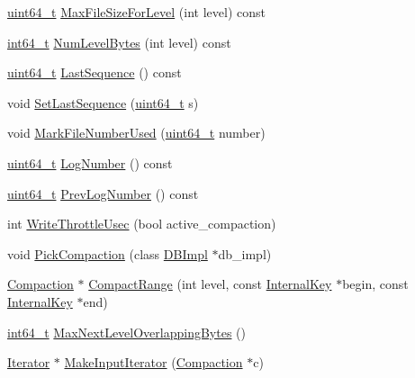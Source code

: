 \begin{DoxyCompactItemize}
\hyperlink{stdint_8h_aaa5d1cd013383c889537491c3cfd9aad}{uint64\+\_\+t} \hyperlink{classleveldb_1_1_version_set_ac856b3302fd2c4d6cf31e43982c3cf68}{Max\+File\+Size\+For\+Level} (int level) const 
\item 
\hyperlink{stdint_8h_adec1df1b8b51cb32b77e5b86fff46471}{int64\+\_\+t} \hyperlink{classleveldb_1_1_version_set_adfe3e1061becd9e2756b2dd4447b52e0}{Num\+Level\+Bytes} (int level) const 
\item 
\hyperlink{stdint_8h_aaa5d1cd013383c889537491c3cfd9aad}{uint64\+\_\+t} \hyperlink{classleveldb_1_1_version_set_acbbb32422426416b0d5e58d35b151526}{Last\+Sequence} () const 
\item 
void \hyperlink{classleveldb_1_1_version_set_a2234860e72a1ac7361d7bee107da6a07}{Set\+Last\+Sequence} (\hyperlink{stdint_8h_aaa5d1cd013383c889537491c3cfd9aad}{uint64\+\_\+t} s)
\item 
void \hyperlink{classleveldb_1_1_version_set_a8a009a58938b12c7a69bda2b4da115a0}{Mark\+File\+Number\+Used} (\hyperlink{stdint_8h_aaa5d1cd013383c889537491c3cfd9aad}{uint64\+\_\+t} number)
\item 
\hyperlink{stdint_8h_aaa5d1cd013383c889537491c3cfd9aad}{uint64\+\_\+t} \hyperlink{classleveldb_1_1_version_set_a0ff6a25abcf0b0c7d94bd425b6fb0ef2}{Log\+Number} () const 
\item 
\hyperlink{stdint_8h_aaa5d1cd013383c889537491c3cfd9aad}{uint64\+\_\+t} \hyperlink{classleveldb_1_1_version_set_a0c2a382650ba2b987d8059faacbd0c39}{Prev\+Log\+Number} () const 
\item 
int \hyperlink{classleveldb_1_1_version_set_a703b7af8d375c8c2bc75ed02e26ee1c0}{Write\+Throttle\+Usec} (bool active\+\_\+compaction)
\item 
void \hyperlink{classleveldb_1_1_version_set_ad3d3fd4a31d8614fef40d144846513ce}{Pick\+Compaction} (class \hyperlink{classleveldb_1_1_d_b_impl}{D\+B\+Impl} $\ast$db\+\_\+impl)
\item 
\hyperlink{classleveldb_1_1_compaction}{Compaction} $\ast$ \hyperlink{classleveldb_1_1_version_set_a3a03f9a6c86e861be314cf8e01f33142}{Compact\+Range} (int level, const \hyperlink{classleveldb_1_1_internal_key}{Internal\+Key} $\ast$begin, const \hyperlink{classleveldb_1_1_internal_key}{Internal\+Key} $\ast$end)
\item 
\hyperlink{stdint_8h_adec1df1b8b51cb32b77e5b86fff46471}{int64\+\_\+t} \hyperlink{classleveldb_1_1_version_set_a32dc1a7e1eaeeeac89286be3483ad612}{Max\+Next\+Level\+Overlapping\+Bytes} ()
\item 
\hyperlink{classleveldb_1_1_iterator}{Iterator} $\ast$ \hyperlink{classleveldb_1_1_version_set_a181194e96a88e69a60c1fda9cf3c4651}{Make\+Input\+Iterator} (\hyperlink{classleveldb_1_1_compaction}{Compaction} $\ast$c)

\end{DoxyCompactItemize}

